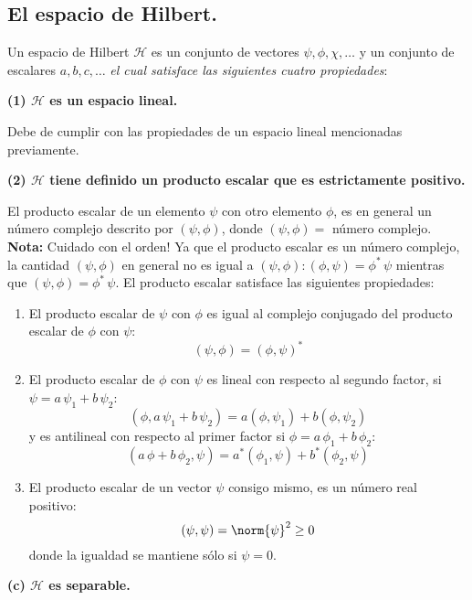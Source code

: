 \subsection{El espacio de Hilbert.}
Un espacio de Hilbert $\mathcal{H}$ es un conjunto de vectores $\psi, \phi, \chi, \ldots$ y un conjunto de escalares $a, b, c, \ldots$ \emph{el cual satisface las siguientes cuatro propiedades}:

\textbf{(1) $\mathcal{H}$ es un espacio lineal.}

Debe de cumplir con las propiedades de un espacio lineal mencionadas previamente.

\textbf{(2) $\mathcal{H}$ tiene definido un producto escalar que es estrictamente positivo.}

El producto escalar de un elemento $\psi$ con otro elemento $\phi$, es en general un número complejo descrito por $(\psi, \phi)$, donde $(\psi, \phi) =$ número complejo. \textbf{Nota: } Cuidado con el orden! Ya que el producto escalar es un número complejo, la cantidad  $(\psi, \phi)$ en general no es igual a  $(\psi, \phi) : (\phi, \psi) = \phi^{*} \, \psi$ mientras que $(\psi, \phi) = \phi^{*} \, \psi$. El producto escalar satisface las siguientes propiedades:
\begin{enumerate}[label=\roman*)]
\item El producto escalar de $\psi$ con $\phi$ es igual al complejo conjugado del producto escalar de $\phi$ con $\psi$:
\begin{equation}
(\psi, \phi) = (\phi, \psi)^{*}
\label{eq:ecuacion_02_04}
\end{equation}
\item El producto escalar de $\phi$ con $\psi$ es lineal con respecto al segundo factor, si $\psi = a \, \psi_{1} + b \, \psi_{2}$:
\begin{equation}
(\phi, a \, \psi_{1} + b \, \psi_{2} ) = a (\phi, \psi_{1}) + b (\phi, \psi_{2})
\label{eq:ecuacion_02_05}
\end{equation}
y es antilineal con respecto al primer factor si $\phi = a \, \phi_{1} + b \, \phi_{2}$:
\begin{equation}
(a \, \phi + b \, \phi_{2}, \psi) = a^{*} (\phi_{1}, \psi) + b^{*} (\phi_{2}, \psi)
\label{eq:ecuacion_02_06}
\end{equation}
\item El producto escalar de un vector $\psi$ consigo mismo, es un número real positivo:
\begin{equation}
(\psi, \psi) = \norm{\psi}^{2} \geq 0
\label{eq:ecuacion_02_07}
\end{equation}
donde la igualdad se mantiene sólo si $\psi = 0$.
\end{enumerate}
\textbf{(c) $\mathcal{H}$ es separable.}

